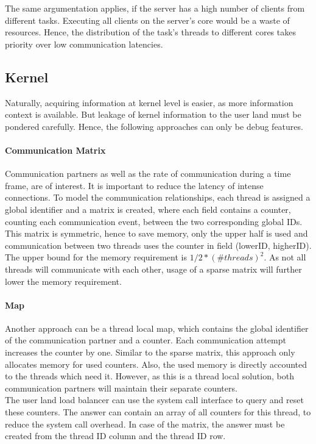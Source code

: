 The same argumentation applies, if the server has a high number of clients from
different tasks.
Executing all clients on the server's core would be a waste of resources.
Hence, the distribution of the task's threads to different cores takes priority
over low communication latencies.


\subsection{Kernel}
Naturally, acquiring information at kernel level is easier, as more information
context is available.
But leakage of kernel information to the user land must be pondered carefully.
Hence, the following approaches can only be debug features.


\paragraph{Communication Matrix}
Communication partners as well as the rate of communication during a time
frame, are of interest.
It is important to reduce the latency of intense connections.
To model the communication relationships, each thread is assigned a global
identifier and a matrix is created, where each field contains a counter,
counting each communication event, between the two corresponding global IDs.
This matrix is symmetric, hence to save memory, only the upper half is used
and communication between two threads uses the counter in field
(lowerID, higherID).
The upper bound for the memory requirement is $1/2 * (\#threads)^2$.
As not all threads will communicate with each other, usage of a sparse matrix
will further lower the memory requirement.

\paragraph{Map}
Another approach can be a thread local map, which contains the global
identifier of the communication partner and a counter.
Each communication attempt increases the counter by one.
Similar to the sparse matrix, this approach only allocates memory for used
counters.
Also, the used memory is directly accounted to the threads which need it.
However, as this is a thread local solution, both communication partners will
maintain their separate counters.
\\

The user land load balancer can use the system call interface to query
and reset these counters.
The answer can contain an array of all counters for this thread, to reduce the
system call overhead.
In case of the matrix, the answer must be created from the thread ID column and
the thread ID row.


